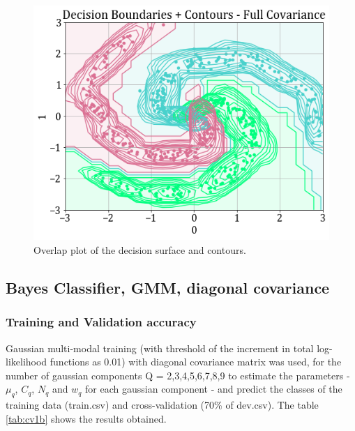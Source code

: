 \documentclass[11pt,a4paper]{article}
\begin{document}
\vspace{-1em}
\begin{figure}[H]
    \centering
    \includegraphics[scale=0.45]{images/1b_full_ds_contours.png}
    \caption{Overlap plot of the decision surface and contours.}
\end{figure}

\subsection{Bayes Classifier, GMM, diagonal covariance}
\subsubsection{Training and Validation accuracy}
Gaussian multi-modal training (with threshold of the increment in total log-likelihood functions as 0.01) with diagonal covariance matrix was used, for the number of gaussian components Q = {2,3,4,5,6,7,8,9} to estimate the parameters - $\mu_q$, $C_q$, $N_q$ and $w_q$ for each gaussian component - and predict the classes of the training data (train.csv) and cross-validation (70\% of dev.csv). The table \ref{tab:cv1b} shows the results obtained.

\end{document}
